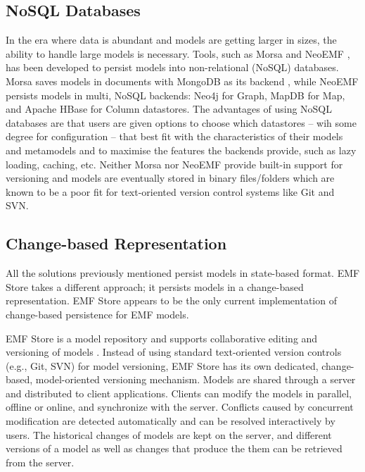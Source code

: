 \subsection{NoSQL Databases}
\label{sec:NoSQL Databases}
In the era where data is abundant and models are getting larger in sizes, the ability to handle large models is necessary. Tools, such as Morsa \cite{DBLP:conf/models/Espinazo-PaganCM11} and NeoEMF \cite{daniel2016neoemf}, has been developed to persist models into non-relational (NoSQL) databases. Morsa saves models in documents with MongoDB as its backend \cite{mongodb}, while NeoEMF persists models in multi, NoSQL backends: Neo4j \cite{neo4j2019neo4j} for Graph, MapDB \cite{mapdb2019mapdb} for Map, and Apache HBase \cite{apache2019hbase} for Column datastores. The advantages of using NoSQL databases are that users are given options to choose which datastores -- wih some degree for configuration -- that best fit with the characteristics of their models and metamodels and to maximise the features  the backends provide, such as lazy loading, caching, etc. Neither Morsa nor NeoEMF provide built-in support for versioning and models are eventually stored in binary files/folders which are known to be a poor fit for text-oriented version control systems like Git and SVN. 

\subsection{Change-based Representation}
\label{sec:change_based_representation}
All the solutions previously mentioned persist models in state-based format. EMF Store \cite{koegel2010emfstore} takes a different approach; it persists models in a change-based representation. EMF Store appears to be the only current implementation of change-based persistence for EMF models.

EMF Store is a model repository and supports collaborative editing and versioning of models \cite{emfstore2019what}. Instead of using standard text-oriented version controls (e.g., Git, SVN) for model versioning, EMF Store has its own dedicated, change-based, model-oriented versioning mechanism. Models are shared through a server and distributed to client applications. Clients can modify the models in parallel, offline or online, and synchronize with the server. Conflicts caused by concurrent modification are detected automatically and can be resolved interactively by users. The historical changes of models are kept on the server, and different versions of a model as well as changes that produce the them can be retrieved from the server. 

